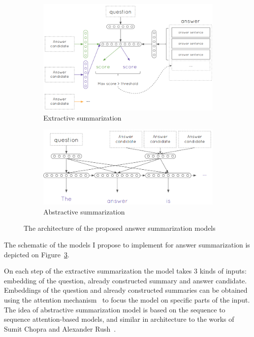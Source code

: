 \begin{figure}
	\centering
	\begin{subfigure}{0.8\textwidth}
		\centering
		\includegraphics[width=\textwidth]{img/answer_summarization_model}
		\caption{Extractive summarization}
		\label{figure:non-factoid:proposal:model:extractive}
	\end{subfigure}
	
	\begin{subfigure}{0.8\textwidth}
		\centering
		\includegraphics[width=\textwidth]{img/answer_summarization_model_abstractive}
		\caption{Abstractive summarization}
		\label{figure:non-factoid:proposal:model:abstractive}
	\end{subfigure}
	\caption{The architecture of the proposed answer summarization models}
	\label{figure:non-factoid:proposal:model}
\end{figure}

The schematic of the models I propose to implement for answer summarization is depicted on Figure~\ref{figure:non-factoid:proposal:model}.

On each step of the extractive summarization the model takes 3 kinds of inputs: embedding of the question, already constructed summary and answer candidate.
Embeddings of the question and already constructed summaries can be obtained using the attention mechanism~\cite{xu2015show} to focus the model on specific parts of the input.
The idea of abstractive summarization model is based on the sequence to sequence attention-based models, and similar in architecture to the works of Sumit Chopra and Alexander Rush~\cite{chopraabstractive16,rush-chopra-weston:2015:EMNLP}.

